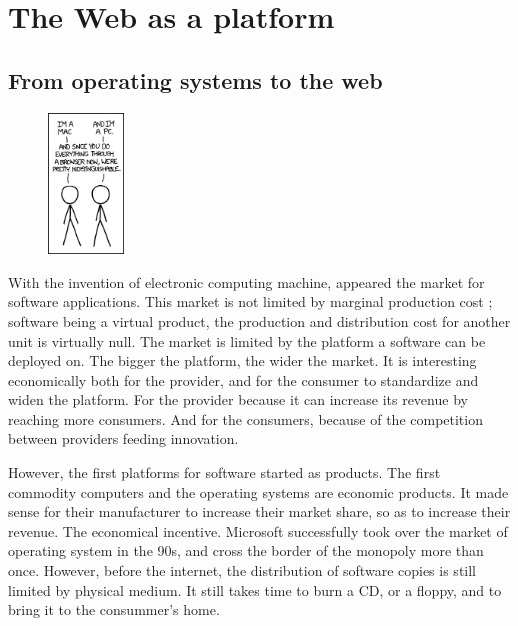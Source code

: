 \section{The Web as a platform}

\subsection{From operating systems to the web}

\begin{figure}
  \vspace{-27pt}
  \begin{center}
    \includegraphics[width=0.18\textwidth]{../ressources/Mac-PC.png}
  \end{center}
  \vspace{-20pt}
\end{figure}

With the invention of electronic computing machine, appeared the market for software applications.
This market is not limited by marginal production cost ; software being a virtual product, the production and distribution cost for another unit is virtually null.
The market is limited by the platform a software can be deployed on.
The bigger the platform, the wider the market.
It is interesting economically both for the provider, and for the consumer to standardize and widen the platform.
For the provider because it can increase its revenue by reaching more consumers.
And for the consumers, because of the competition between providers feeding innovation.

However, the first platforms for software started as products.
The first commodity computers and the operating systems are economic products.
It made sense for their manufacturer to increase their market share, so as to increase their revenue.
The economical incentive.
Microsoft successfully took over the market of operating system in the 90s, and cross the border of the monopoly more than once.
However, before the internet, the distribution of software copies is still limited by physical medium.
It still takes time to burn a CD, or a floppy, and to bring it to the consummer's home.

